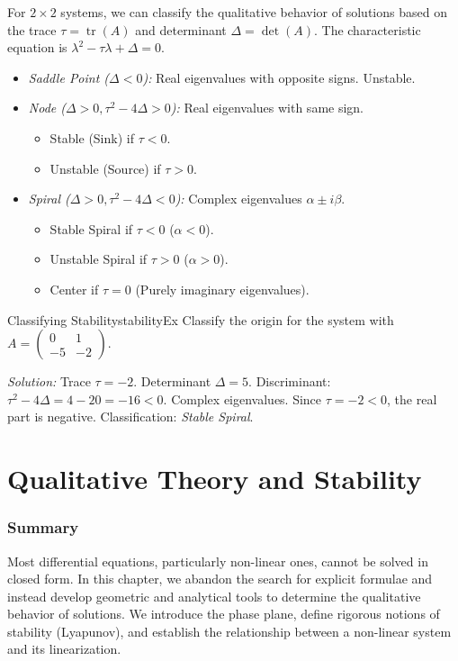 \documentclass{book}
\begin{document}
For $2 \times 2$ systems, we can classify the qualitative behavior of solutions based on the trace $\tau = \operatorname{tr}(A)$ and determinant $\Delta = \det(A)$. The characteristic equation is $\lambda^2 - \tau\lambda + \Delta = 0$.

\begin{itemize}
    \item \emph{Saddle Point ($\Delta < 0$):} Real eigenvalues with opposite signs. Unstable.
    \item \emph{Node ($\Delta > 0, \tau^2 - 4\Delta > 0$):} Real eigenvalues with same sign.
    \begin{itemize}
        \item Stable (Sink) if $\tau < 0$.
        \item Unstable (Source) if $\tau > 0$.
    \end{itemize}
    \item \emph{Spiral ($\Delta > 0, \tau^2 - 4\Delta < 0$):} Complex eigenvalues $\alpha \pm i\beta$.
    \begin{itemize}
        \item Stable Spiral if $\tau < 0$ ($\alpha < 0$).
        \item Unstable Spiral if $\tau > 0$ ($\alpha > 0$).
        \item Center if $\tau = 0$ (Purely imaginary eigenvalues).
    \end{itemize}
\end{itemize}

\begin{example}{Classifying Stability}{stabilityEx}
    Classify the origin for the system with $A = \begin{pmatrix} 0 & 1 \\ -5 & -2 \end{pmatrix}$.

    \emph{Solution:}
    Trace $\tau = -2$. Determinant $\Delta = 5$.
    Discriminant: $\tau^2 - 4\Delta = 4 - 20 = -16 < 0$. Complex eigenvalues.
    Since $\tau = -2 < 0$, the real part is negative.
    Classification: \emph{Stable Spiral}.
\end{example}


\chapter{Qualitative Theory and Stability}\label{cha:stability}

\subsection*{Summary}
Most differential equations, particularly non-linear ones, cannot be solved in closed form. In this chapter, we abandon the search for explicit formulae and instead develop geometric and analytical tools to determine the qualitative behavior of solutions. We introduce the phase plane, define rigorous notions of stability (Lyapunov), and establish the relationship between a non-linear system and its linearization.
\end{document}

